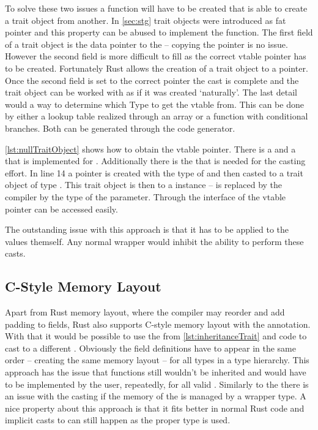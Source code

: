 \documentclass[thesis]{subfiles}
\begin{document}
    To solve these two issues a  function will have to be created that is able to create a trait object from another.
    In \autoref{sec:stg} trait objects were introduced as fat pointer and this property can be abused to implement the  function.
    The first field of a trait object is the data pointer to the \struct -- copying the pointer is no issue.
    However the second field is more difficult to fill as the correct vtable pointer has to be created.
    Fortunately Rust allows the creation of a trait object to a  pointer.
    Once the second field is set to the correct pointer the cast is complete and the trait object can be worked with as if it was created `naturally'.
    The last detail would a way to determine which Type to get the vtable from.
    This can be done by either a lookup table realized through an array or a function with conditional branches.
    Both can be generated through the code generator.

    

    \autoref{lst:nullTraitObject} shows how to obtain the vtable pointer.
    There is a  and a  that is implemented for .
    Additionally there is the  that is needed for the casting effort.
    In line 14 a  pointer is created with the type of  and then casted to a trait object of type .
    This trait object is then  to a  instance -- \codr{_} is replaced by the compiler by the type of the parameter.
    Through the interface of  the vtable pointer can be accessed easily.

    The outstanding issue with this approach is that it has to be applied to the values themself.
    Any normal wrapper would inhibit the ability to perform these casts.

  \subsection{C-Style Memory Layout}
    Apart from Rust memory layout, where the compiler may reorder and add padding to fields, Rust also supports C-style memory layout with the \codr{#[repr(C)]} annotation.
    With that it would be possible to use the \structs from \autoref{lst:inheritanceTrait} and  code to cast to a different \struct.
    Obviously the field definitions have to appear in the same order -- creating the same memory layout -- for all types in a type hierarchy.
    This approach has the issue that functions still wouldn't be inherited and would have to be implemented by the user, repeatedly, for all valid \structs.
    Similarly to the \traits there is an issue with the casting if the memory of the \struct is managed by a wrapper type.
    A nice property about this approach is that it fits better in normal Rust code and implicit casts to  can still happen as the proper type is used.
\end{document}
